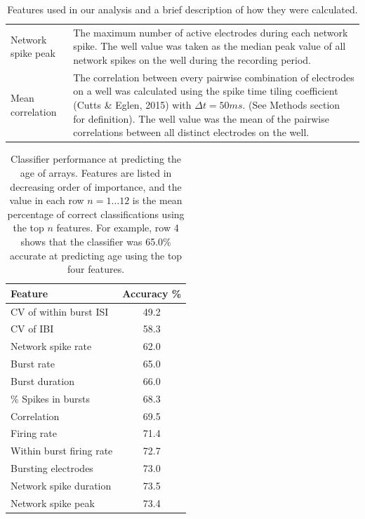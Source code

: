 \documentclass{article}
\begin{document}
\begin{table}
\begin{tabular}{|l|m{11cm}|}
  		\\ Network spike peak  & The maximum number of active electrodes during each network spike. The well value was taken as the median peak value of all network spikes on the well during the recording period. 
  		\\ Mean correlation & The correlation between every pairwise combination of electrodes on a well was calculated using the spike time tiling coefficient (Cutts \& Eglen, 2015) with $\Delta t = 50ms$. (See Methods section for definition). The well value was the mean of the pairwise correlations between all distinct electrodes on the well. 
  		\\ \hline
  	\end{tabular}
  \caption{Features used in our analysis and a brief description of how
    they were calculated.}
\end{table}

\begin{table}
  \centering
  \begin{tabular}{|l|c|}
  	\hline
  	\textbf{Feature} & \textbf{Accuracy \%}
  	\\ \hline 
  	CV of within burst ISI & 49.2
  	\\CV of IBI & 58.3
  	\\ Network spike rate& 62.0
  	\\ Burst rate & 65.0
  	\\ Burst duration& 66.0
  	\\ \% Spikes in bursts & 68.3
  	\\Correlation & 69.5
  	\\Firing rate & 71.4
  	\\Within burst firing rate & 72.7
  	\\Bursting electrodes & 73.0
  	\\ Network spike duration & 73.5
  	\\Network spike peak & 73.4
  	\\ \hline
  \end{tabular}
  \caption {Classifier performance at predicting the age of
arrays. Features are listed in decreasing order of importance, and the
value in each row $n=1 \ldots 12$ is the mean percentage of correct
classifications using the top $n$ features.  For example, row 4 shows
that the classifier was 65.0\% accurate at predicting age using the
top four features. }
\end{table}
\end{document}
